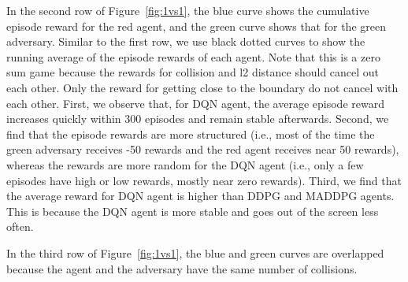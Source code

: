 In the second row of Figure~\ref{fig:1vs1}, the blue curve shows the cumulative
episode reward for the red agent, and the green curve shows that for the green
adversary. Similar to the first row, we use black dotted curves to show the
running average of the episode rewards of each agent. Note that this is a zero
sum game because the rewards for collision and l2 distance should cancel out
each other. Only the reward for getting close to the boundary do not cancel
with each other. First, we observe that,
for DQN agent, the average episode reward increases quickly within 300
episodes and remain stable afterwards. Second, we find that the episode rewards
are more structured (i.e., most of the time the green adversary receives -50
rewards and the red agent receives near 50 rewards), whereas the rewards are
more random for the DQN agent (i.e., only a few episodes have high or low
rewards, mostly near zero rewards). Third, we find that the average reward for
DQN agent is higher than DDPG and MADDPG agents. This is because the DQN agent
is more stable and goes out of the screen less often.

In the third row of Figure~\ref{fig:1vs1}, the blue and green curves are
overlapped because the agent and the adversary have the same number of
collisions.


